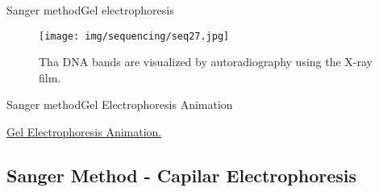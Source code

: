 \documentclass[10pt]{beamer}
\newcommand{\1}{
	\setbeamertemplate{background}{
		\texttt{[image: img/1]}
		\tikz[overlay] \fill[fill opacity=0.75,fill=white] (0,0) rectangle (-\paperwidth,\paperheight);
	}
}
\begin{document}
\begin{frame}{Sanger method}{Gel electrophoresis}
	\begin{figure}[]
		\centering
		\texttt{[image: img/sequencing/seq27.jpg]}
		\label{img:mot2}
		\caption{Tha DNA bands are visualized by autoradiography using the X-ray film.}
	\end{figure}
\end{frame}


\begin{frame}{Sanger method}{Gel Electrophoresis Animation}
	\begin{block}{}
		\href{https://www.youtube.com/watch?v=YeHtjO7vlyg&t=20s}{Gel Electrophoresis Animation.}
		
	\end{block}
\end{frame}




\subsection{Sanger Method - Capilar Electrophoresis}
\end{document}
